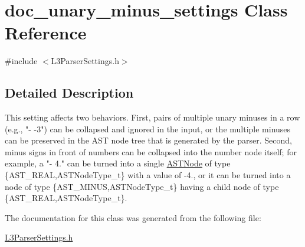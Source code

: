 \hypertarget{classdoc__unary__minus__settings}{}\section{doc\+\_\+unary\+\_\+minus\+\_\+settings Class Reference}
\label{classdoc__unary__minus__settings}


{\ttfamily \#include $<$L3\+Parser\+Settings.\+h$>$}



\subsection{Detailed Description}
\begin{DoxyParagraph}{}
This setting affects two behaviors. First, pairs of multiple unary minuses in a row (e.\+g., "{\ttfamily -\/ -\/3}") can be collapsed and ignored in the input, or the multiple minuses can be preserved in the A\+ST node tree that is generated by the parser. Second, minus signs in front of numbers can be collapsed into the number node itself; for example, a "{\ttfamily -\/ 4.}" can be turned into a single \hyperlink{class_a_s_t_node}{A\+S\+T\+Node} of type \{A\+S\+T\+\_\+\+R\+E\+AL,A\+S\+T\+Node\+Type\+\_\+t\} with a value of {\ttfamily -\/4.}, or it can be turned into a node of type \{A\+S\+T\+\_\+\+M\+I\+N\+US,A\+S\+T\+Node\+Type\+\_\+t\} having a child node of type \{A\+S\+T\+\_\+\+R\+E\+AL,A\+S\+T\+Node\+Type\+\_\+t\}. 
\end{DoxyParagraph}


The documentation for this class was generated from the following file\+:\begin{DoxyCompactItemize}
\item 
\hyperlink{_l3_parser_settings_8h}{L3\+Parser\+Settings.\+h}\end{DoxyCompactItemize}
